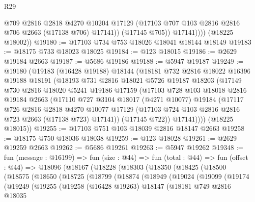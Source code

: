 \begin{lexlean}{R29}
\begin{coremodule}
                  @709
                  @2816
                  @2818
                  @4270
                  @10204
                  @17129
                  (@17103 @707 @103 @2816 @2816 @706 @2663 (@17138 @706) @17141))
                (@17145 @705))
              @17141))))
      (@18225 @18002))
@19180 := @17103 @734 @753 @18026 @18041 @18144 @18149
@19183 := @18175 @733 @18023 @18025
@19184 := @123 @18015
@19186 := @2629 @19184 @2663
@19187 := @5686 @19186
@19188 := @5947 @19187
@19249 := @19180
    (@19183
      (@16428 @19188)
      @18144
      (@18181
        @732
        @2816
        @18022
        @16396
        @19188
        @18191
        (@18193
          @731
          @2816
          @18021
          @5726
          @19187
          @18203
          (@17149
            @730
            @2816
            @18020
            @5241
            @19186
            @17159
            (@17103
              @728
              @103
              @18018
              @2816
              @19184
              @2663
              (@17110
                @727
                @3104
                @18017
                (@4271 @10077)
                @19184
                (@17117
                  @726
                  @2816
                  @2818
                  @4270
                  @10077
                  @17129
                  (@17103 @724 @103 @2816 @2816 @723 @2663 (@17138 @723) @17141))
                (@17145 @722))
              @17141))))
      (@18225 @18015))
@19255 := @17103 @751 @103 @18039 @2816 @18147 @2663
@19258 := @18175 @750 @18036 @18038
@19259 := @123 @18028
@19261 := @2629 @19259 @2663
@19262 := @5686 @19261
@19263 := @5947 @19262
@19348 := fun (message : @16199) =>
  fun (size : @44) =>
  fun (total : @44) =>
  fun (offset : @44) =>
  @18096
    (@18167
      (@18228
        (@18303
          (@18350
            (@18425
              (@18500
                (@18575
                  (@18650
                    (@18725
                      (@18799
                        (@18874
                          (@18949
                            (@19024
                              (@19099
                                (@19174
                                  (@19249
                                    (@19255
                                      (@19258
                                        (@16428 @19263)
                                        @18147
                                        (@18181
                                          @749
                                          @2816
                                          @18035

\end{coremodule}
\end{lexlean}
